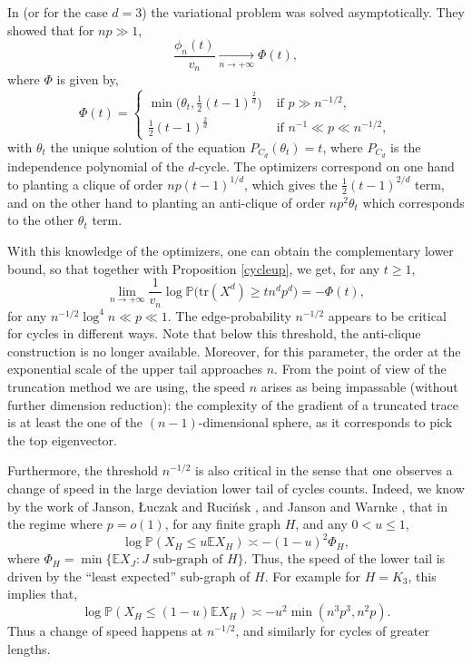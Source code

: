 \documentclass[aop,preprint]{imsart}
\newcommand\PP{\mathbb{P}}
\newcommand\EE{\mathbb{E}}
\newcommand\tr{\mathrm{tr}}
\numberwithin{equation}{section}
\theoremstyle{definition}
\theoremstyle{plain}
\theoremstyle{remark}
\begin{document}
In \cite[Theorem 1.5]{BGLZ} (or \cite[Theorem 1.1]{LZ} for the case $d=3$) the variational problem was solved asymptotically.  They showed that for $np\gg 1$,
\begin{equation} \label{defPhic} \frac{\phi_n(t)}{v_n}  \underset{n\to +\infty}{\longrightarrow} \Phi(t),\end{equation} where $\Phi$ is given by, 
\begin{equation} \label{defPhi} \Phi(t) = \begin{cases}
\min\big( \theta_t, \frac{1}{2}(t-1)^{\frac{2}{d}}\big) &\text{ if } p \gg n^{-1/2},\\
\frac{1}{2}(t-1)^{\frac{2}{d}} & \text{ if } n^{-1} \ll p \ll n^{-1/2},
\end{cases}\end{equation}
with $\theta_t$ the unique solution of the equation $P_{C_d}(\theta_t) = t$, where $P_{C_d}$ is the independence polynomial of the $d$-cycle.
The optimizers correspond on one hand to planting a clique of order $np (t-1)^{1/d}$, which gives the $\frac{1}{2} (t-1)^{2/d}$ term, and on the other hand to planting an anti-clique of order  $np^2 \theta_{t}$ which corresponds to the other $\theta_t$ term. 

With this knowledge of the optimizers, one can obtain the complementary lower bound, so that together with Proposition \ref{cycleup}, we get, for any $t\geq 1$,
$$ \lim_{n\to +\infty} \frac{1}{v_n} \log\PP\big( \tr (X^d) \geq t n^dp^d \big) =-  \Phi(t),$$
for any $n^{-1/2}\log^4 n \ll p\ll 1$.  The edge-probability $n^{-1/2}$ appears to be critical for cycles in different ways. Note that below this threshold, the anti-clique construction is no longer available. Moreover, for this parameter,  the order at the exponential scale of the upper tail approaches $n$. From the point of view of the truncation method we are using, the speed $n$ arises as being impassable (without further dimension reduction): the complexity of the gradient of a truncated trace is at least the one of the $(n-1)$-dimensional sphere, as it corresponds to pick the top eigenvector.

 Furthermore, the threshold $n^{-1/2}$ is also critical in the sense that one observes a change of speed in the large deviation lower tail of cycles counts. Indeed, we know by the work of  Janson,  {\L}uczak and Ruci{\'n}sk \cite{JLR}, and Janson and Warnke \cite{JW}, that in the regime where $p=o(1)$, for any finite graph $H$, and any $0< u \leq 1$,
$$ \log \PP( X_H \leq u \EE X_H) \asymp -(1-u)^2 \Phi_H,$$
where $\Phi_H = \min \{ \EE X_J : J \text{ sub-graph of } H \}$. Thus, the speed of the lower tail is driven by the ``least expected'' sub-graph of $H$. For example for $H = K_3$, this implies that,
$$ \log \PP( X_H \leq (1-u) \EE X_H) \asymp -u^2 \min(n^3p^3, n^2p).$$
Thus a change of speed happens at $n^{-1/2}$, and similarly for cycles of greater lengths.
\end{document}

